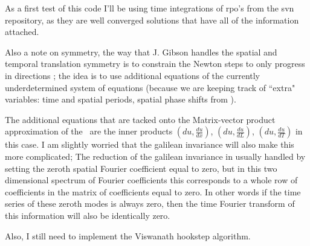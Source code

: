 \begin{description}
{\begin{description}
As a first test of this code I'll be using time integrations of rpo's from the svn repository, as they
are well converged solutions that have all of the information attached.

Also a note on symmetry, the way that J. Gibson
 handles the spatial and temporal
translation symmetry is to constrain the Newton steps to only progress in
directions ;
the idea is to use
additional equations of the currently underdetermined system of equations
(because we are keeping track of ``extra" variables: time and spatial periods,
spatial phase shifts from \rpo).

The additional equations that are tacked onto the Matrix-vector product approximation
of the \jacobianM\ are the inner products $( du, \frac{du}{dx} )$, $( du, \frac{du}{dL} )$, $( du, \frac{du}{dT} )$ in this
case. I am slightly worried that the galilean invariance will also make this more complicated; The reduction of the
galilean invariance in usually handled by setting the zeroth spatial Fourier coefficient equal to zero, but in this
two dimensional spectrum of Fourier coefficients this corresponds to a whole row of coefficients in the matrix
of coefficients equal to zero. In other words if the time series of these zeroth modes is always zero, then
the time Fourier transform of this information will also be identically zero.

Also, I still need to implement the Viswanath hookstep algorithm.

\end{description}
}

\end{description}
